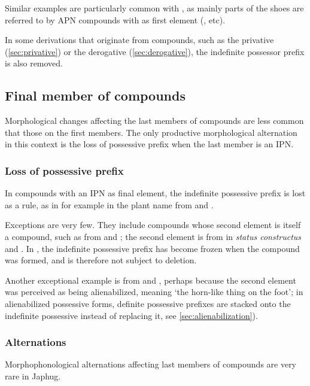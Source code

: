 Similar examples are particularly common with , as mainly parts of the shoes are referred to by APN compounds with  as first element (,  etc).

In some derivations that originate from compounds, such as the privative (\ref{sec:privative}) or the derogative  (\ref{sec:derogative}), the indefinite possessor prefix is also removed.

\subsection{Final member of compounds} \label{sec:final.compounds}
Morphological changes affecting the last members of compounds are less common that those on the first members. The only productive morphological alternation in this context is the loss of possessive prefix when the last member is an IPN.

\subsubsection{Loss of possessive prefix} \label{sec:possessive.prefix.second.compounds}
In compounds with an IPN as final element, the indefinite possessive prefix is lost as a rule, as in for example in the plant name  from  and .

Exceptions are very few. They include compounds whose second element is itself a compound, such as  from  and ; the second element is from  in \textit{status constructus} and . In , the indefinite possessive prefix  has become frozen when the compound  was formed, and is therefore not subject to deletion.

Another exceptional example is  from  and , perhaps because the second element was perceived as being alienabilized, meaning `the horn-like thing on the foot'; in alienabilized possessive forms, definite possessive prefixes are stacked onto the indefinite possessive instead of replacing it,  see \ref{sec:alienabilization}).

\subsubsection{Alternations} \label{sec:second.member.alternation} 
Morphophonological alternations affecting last members of compounds are very rare in Japhug. 

